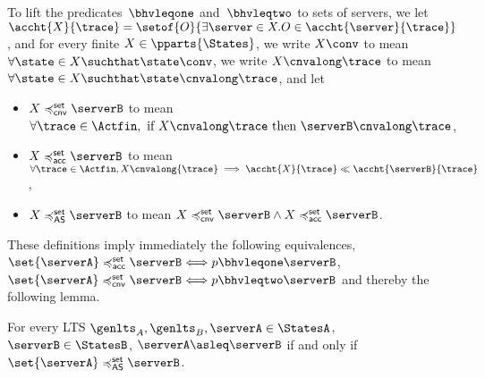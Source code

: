 To lift the predicates~$\bhvleqone$ and~$\bhvleqtwo$ to sets of servers,
we let $\accht{ X }{ \trace } = \setof{ O }{ \exists \server \in X . O
  \in \accht{\server}{ \trace }}$, and for every finite $X \in
\pparts{ \States }$, we write $X \conv$ to mean $\forall \state \in X \suchthat\state \conv$, we write $  X \cnvalong \trace$ to mean $\forall \state \in X \suchthat \state \cnvalong \trace$, and let

\begin{itemize}
\item $ X \cnvleqset \serverB$ to mean $\forall \trace \in \Actfin,
  \text{ if } X \cnvalong \trace
  \text{ then } \serverB \cnvalong \trace$,

\item
  $X \accleqset \serverB$ to mean $\forall \trace \in \Actfin,
  X \cnvalong{\trace} \implies \accht{ X }{ \trace } \ll \accht{ \serverB }{ \trace }$,

\item
  $X \asleqset \serverB$ to mean $X \cnvleqset \serverB \wedge X \accleqset \serverB$.
\end{itemize}

These definitions imply immediately the following equivalences,
  $
\set{\serverA} \accleqset \serverB \Longleftrightarrow p \bhvleqone \serverB$,
$\set{\serverA} \cnvleqset \serverB \Longleftrightarrow p \bhvleqtwo \serverB $
and thereby the following lemma.
\begin{lemma}
  \label{lem:alt-set-singleton-iff}
  For every LTS $\genlts_A, \genlts_B, \serverA \in \StatesA$,
  $\serverB \in \StatesB$,
  $\serverA \asleq \serverB$ if and only if $\set{\serverA} \asleqset \serverB$.
\end{lemma}


